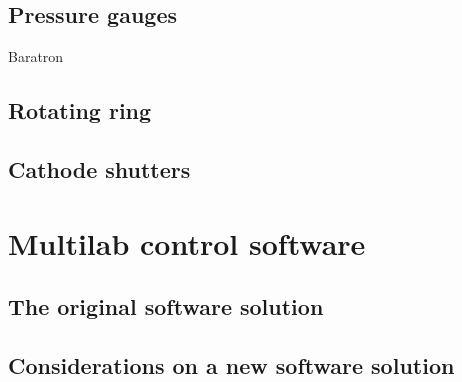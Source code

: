 \subsection{Pressure gauges}
Baratron\\

\subsection{Rotating ring}

\subsection{Cathode shutters}

\section{Multilab control software}\label{sec:ml_software}
\subsection{The original software solution}
\subsection{Considerations on a new software solution}
